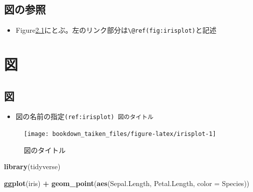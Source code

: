 \documentclass[xelatex, ja=standard, b5paper]{bxjsbook}
\newenvironment{Shaded}{\begin{snugshade}}{\end{snugshade}}
\newcommand{\DataTypeTok}[1]{\textcolor[rgb]{0.13,0.29,0.53}{#1}}
\newcommand{\KeywordTok}[1]{\textcolor[rgb]{0.13,0.29,0.53}{\textbf{#1}}}
\newcommand{\NormalTok}[1]{#1}
\newcommand{\OperatorTok}[1]{\textcolor[rgb]{0.81,0.36,0.00}{\textbf{#1}}}
\newcommand{\StringTok}[1]{\textcolor[rgb]{0.31,0.60,0.02}{#1}}
\providecommand{\tightlist}{%
  \setlength{\itemsep}{0pt}\setlength{\parskip}{0pt}}
\begin{document}
\hypertarget{intro_sansho}{%
\section{図の参照}\label{intro_sansho}}

\begin{itemize}
\tightlist
\item
  Figure\ref{fig:irisplot}にとぶ。左のリンク部分は\texttt{\textbackslash{}@ref(fig:irisplot)}と記述
\end{itemize}

\hypertarget{figure}{%
\chapter{図}\label{figure}}

\hypertarget{figure_fig}{%
\section{図}\label{figure_fig}}

\begin{itemize}
\tightlist
\item
  図の名前の指定\texttt{(ref:irisplot)\ 図のタイトル}
\end{itemize}



\begin{Shaded}
\end{Shaded}

\begin{figure}

{\centering \texttt{[image: bookdown\_taiken\_files/figure-latex/irisplot-1]} 

}

\caption{図のタイトル}\label{fig:irisplot}
\end{figure}



\begin{Shaded}
\begin{Highlighting}[]
\KeywordTok{library}\NormalTok{(tidyverse)}
\end{Highlighting}
\end{Shaded}

\begin{Shaded}
\begin{Highlighting}[]
\KeywordTok{ggplot}\NormalTok{(iris) }\OperatorTok{+}
\StringTok{  }\KeywordTok{geom_point}\NormalTok{(}\KeywordTok{aes}\NormalTok{(Sepal.Length, Petal.Length, }\DataTypeTok{color =}\NormalTok{ Species))}
\end{Highlighting}
\end{Shaded}
\end{document}
